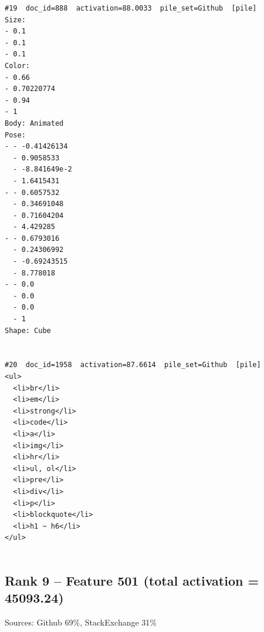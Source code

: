 \begin{verbatim}
#19  doc_id=888  activation=88.0033  pile_set=Github  [pile]
Size:
- 0.1
- 0.1
- 0.1
Color:
- 0.66
- 0.70220774
- 0.94
- 1
Body: Animated
Pose:
- - -0.41426134
  - 0.9058533
  - -8.841649e-2
  - 1.6415431
- - 0.6057532
  - 0.34691048
  - 0.71604204
  - 4.429285
- - 0.6793016
  - 0.24306992
  - -0.69243515
  - 8.778018
- - 0.0
  - 0.0
  - 0.0
  - 1
Shape: Cube


#20  doc_id=1958  activation=87.6614  pile_set=Github  [pile]
<ul>
  <li>br</li>
  <li>em</li>
  <li>strong</li>
  <li>code</li>
  <li>a</li>
  <li>img</li>
  <li>hr</li>
  <li>ul, ol</li>
  <li>pre</li>
  <li>div</li>
  <li>p</li>
  <li>blockquote</li>
  <li>h1 ~ h6</li>
</ul>


\end{verbatim}

\subsection*{Rank 9 -- Feature 501 (total activation = 45093.24)}

Sources: Github 69\%, StackExchange 31\%

